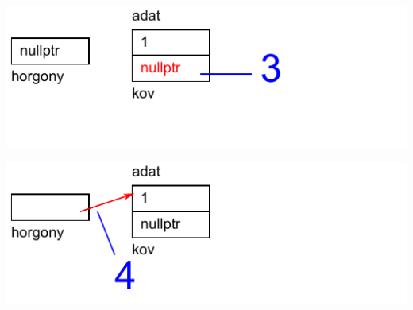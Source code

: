 \begin{frame}
  \begin{center}
    \includegraphics[scale=0.6]{lista1/list1-03.pdf}
  \end{center}
  \vspace{-.2cm}
  \begin{exampleblock}{}
    \vspace{-.2cm}
    
    \vspace{-.2cm}
  \end{exampleblock}
\end{frame}

\begin{frame}
  \begin{center}
    \includegraphics[scale=0.6]{lista1/list1-04.pdf}
  \end{center}
  \vspace{-.2cm}
  \begin{exampleblock}{}
    \vspace{-.2cm}
    
    \vspace{-.2cm}
  \end{exampleblock}
\end{frame}


